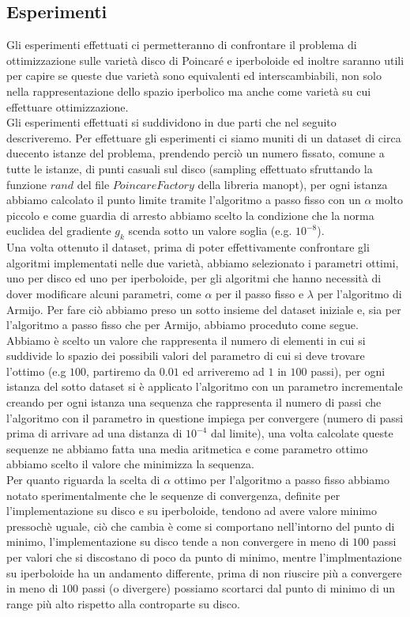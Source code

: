 \documentclass[a4paper, 12pt]{article}
\begin{document}
\subsection{Esperimenti}
Gli esperimenti effettuati ci permetteranno di confrontare il problema di ottimizzazione sulle varietà disco di Poincaré e iperboloide ed inoltre saranno utili per capire se queste due varietà sono equivalenti ed interscambiabili, non solo nella rappresentazione dello spazio iperbolico ma anche come varietà su cui effettuare ottimizzazione.\\
Gli esperimenti effettuati si suddividono in due parti che nel seguito descriveremo. Per effettuare gli esperimenti ci siamo muniti di un dataset di circa duecento istanze del problema, prendendo perciò un numero fissato, comune a tutte le istanze, di punti casuali sul disco (sampling effettuato sfruttando la funzione $rand$ del file $PoincareFactory$ della libreria manopt), per ogni istanza abbiamo calcolato il punto limite tramite l'algoritmo a passo fisso con un $\alpha$ molto piccolo e come guardia di arresto abbiamo scelto la condizione che la norma euclidea del gradiente $g_k$ scenda sotto un valore soglia (e.g. $10^{-8}$).\\
Una volta ottenuto il dataset, prima di poter effettivamente confrontare gli algoritmi implementati nelle due varietà, abbiamo selezionato i parametri ottimi, uno per disco ed uno per iperboloide, per gli algoritmi che hanno necessità di dover modificare alcuni parametri, come $\alpha$ per il passo fisso e $\lambda$ per l'algoritmo di Armijo. Per fare ciò abbiamo preso un sotto insieme del dataset iniziale e, sia per l'algoritmo a passo fisso che per Armijo, abbiamo proceduto come segue. Abbiamo è scelto un valore che rappresenta il numero di elementi in cui si suddivide lo spazio dei possibili valori del parametro di cui si deve trovare  l'ottimo (e.g $100$, partiremo da $0.01$ ed arriveremo ad $1$ in $100$ passi), per ogni istanza del sotto dataset si è applicato l'algoritmo con un parametro incrementale creando per ogni istanza una sequenza che rappresenta il numero di passi che l'algoritmo con il parametro in questione impiega per convergere (numero di passi prima di arrivare ad una distanza di $10^{-4}$ dal limite), una volta calcolate queste sequenze ne abbiamo fatta una media aritmetica e come parametro ottimo abbiamo scelto il valore che minimizza la sequenza.\\
Per quanto riguarda la scelta di $\alpha$ ottimo per l'algoritmo a passo fisso abbiamo notato sperimentalmente che le sequenze di convergenza, definite per l'implementazione su disco e su iperboloide, tendono ad avere valore minimo pressochè uguale, ciò che cambia è come si comportano nell'intorno del punto di minimo, l'implementazione su disco tende a non convergere in meno di $100$ passi per valori che si discostano di poco da punto di minimo, mentre l'implmentazione su iperboloide ha un andamento differente, prima di non riuscire più a convergere in meno di $100$ passi (o divergere) possiamo scortarci dal punto di minimo di un range più alto rispetto alla controparte su disco.\\
\end{document}
